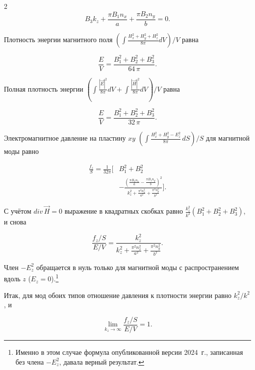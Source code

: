 \documentclass[twoside, 10pt]{article}
\begin{document}
\begin{multicols}{2}
\begin{equation}B_{3} k_{z} + \frac{\pi B_{1} n_{x}}{a} + \frac{\pi B_{2} n_{y}}{b} = 0.\end{equation}

    Плотность энергии магнитного поля
\(\left(\int \frac{H_x^2+H_y^2+H_z^2}{8 \pi}dV\right)\big/{V}\) равна

\begin{equation}\frac{E}{V} = \frac{{B_{1}^{2} + B_{2}^{2} + B_{3}^{2}}}{64 \, \pi}.\end{equation}

    Полная плотность энергии
\(\left(\int \frac{|\vec{E}|^2}{8 \pi}dV + \int \frac{|\vec{H}|^2}{8 \pi}dV\right)\big/{V}\) равна

\begin{equation}\frac{E}{V} = \frac{{B_{1}^{2} + B_{2}^{2} + B_{3}^{2}}}{32 \, \pi}.\end{equation}

    Электромагнитное давление на пластину \(xy\)
\(\left(\int \frac{H_x^2+H_y^2-E_z^2}{8\pi}\,dS\right)\big/S\) для магнитной моды равно

\begin{equation}\begin{aligned}\frac{f_z}{S}=\frac{1}{32\pi}\Bigg[&B_{1}^{2} + B_{2}^{2}\\
&- \frac{\left(\frac{\pi B_{2} n_{x}}{a} - \frac{\pi B_{1} n_{y}}{b}\right)^{2}}{k_{z}^{2} + \frac{\pi^{2} n_{x}^{2}}{a^{2}} + \frac{\pi^{2} n_{y}^{2}}{b^{2}}}\Bigg].\end{aligned}\end{equation}

С учётом \(div\,\vec{H}=0\) выражение в квадратных скобках равно
\(\frac{k_z^2}{k^2}\left(B_1^2+B_2^2+B_3^2\right)\), и снова

\begin{equation}\frac{f_z/S}{E/V} = \frac{k_{z}^{2}}{k_{z}^{2} + \frac{\pi^{2} n_{x}^{2}}{a^{2}} + \frac{\pi^{2} n_{y}^{2}}{b^{2}}}.\end{equation}

Член \(-E_z^2\) обращается в нуль только для магнитной моды с распространением вдоль \(z\)
(\(E_z=0\)).\footnote{Именно в этом случае формула опубликованной версии 2024~г., записанная без члена \(-E_z^2\), давала верный результат.}

Итак, для мод обоих типов отношение давления к плотности энергии равно \(k_z^2/k^2\), и

\begin{equation}\lim_{k_z \to \infty}\frac{f_z/S}{E/V} = 1.\end{equation}


\end{multicols}
\end{document}
